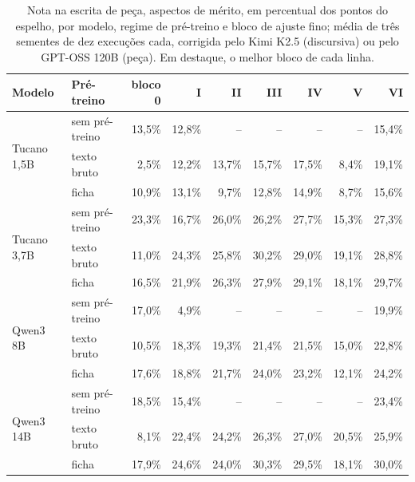 \documentclass{IOS-Book-Article}
\begin{document}
\begin{table}[!ht]
\centering
\caption{Nota na escrita de peça, aspectos de mérito, em percentual dos pontos do espelho, por modelo, regime de pré-treino e bloco de ajuste fino; média de três sementes de dez execuções cada, corrigida pelo Kimi K2.5 (discursiva) ou pelo GPT-OSS 120B (peça). Em destaque, o melhor bloco de cada linha.}
\footnotesize\setlength{\tabcolsep}{3pt}
\begin{tabular}{llrrrrrrr}
\hline
\textbf{Modelo} & \textbf{Pré-treino} & \textbf{bloco 0} & \textbf{I} & \textbf{II} & \textbf{III} & \textbf{IV} & \textbf{V} & \textbf{VI} \\
\hline
\multirow{3}{*}{Tucano 1,5B} & sem pré-treino & 13,5\% & 12,8\% & -- & -- & -- & -- & 15,4\% \\
 & texto bruto & 2,5\% & 12,2\% & 13,7\% & 15,7\% & 17,5\% & 8,4\% & 19,1\% \\
 & ficha & 10,9\% & 13,1\% & 9,7\% & 12,8\% & 14,9\% & 8,7\% & 15,6\% \\
\multirow{3}{*}{Tucano 3,7B} & sem pré-treino & 23,3\% & 16,7\% & 26,0\% & 26,2\% & 27,7\% & 15,3\% & 27,3\% \\
 & texto bruto & 11,0\% & 24,3\% & 25,8\% & 30,2\% & 29,0\% & 19,1\% & 28,8\% \\
 & ficha & 16,5\% & 21,9\% & 26,3\% & 27,9\% & 29,1\% & 18,1\% & 29,7\% \\
\multirow{3}{*}{Qwen3 8B} & sem pré-treino & 17,0\% & 4,9\% & -- & -- & -- & -- & 19,9\% \\
 & texto bruto & 10,5\% & 18,3\% & 19,3\% & 21,4\% & 21,5\% & 15,0\% & 22,8\% \\
 & ficha & 17,6\% & 18,8\% & 21,7\% & 24,0\% & 23,2\% & 12,1\% & 24,2\% \\
\multirow{3}{*}{Qwen3 14B} & sem pré-treino & 18,5\% & 15,4\% & -- & -- & -- & -- & 23,4\% \\
 & texto bruto & 8,1\% & 22,4\% & 24,2\% & 26,3\% & 27,0\% & 20,5\% & 25,9\% \\
 & ficha & 17,9\% & 24,6\% & 24,0\% & 30,3\% & 29,5\% & 18,1\% & 30,0\% \\
\hline
\end{tabular}
\end{table}
\end{document}
